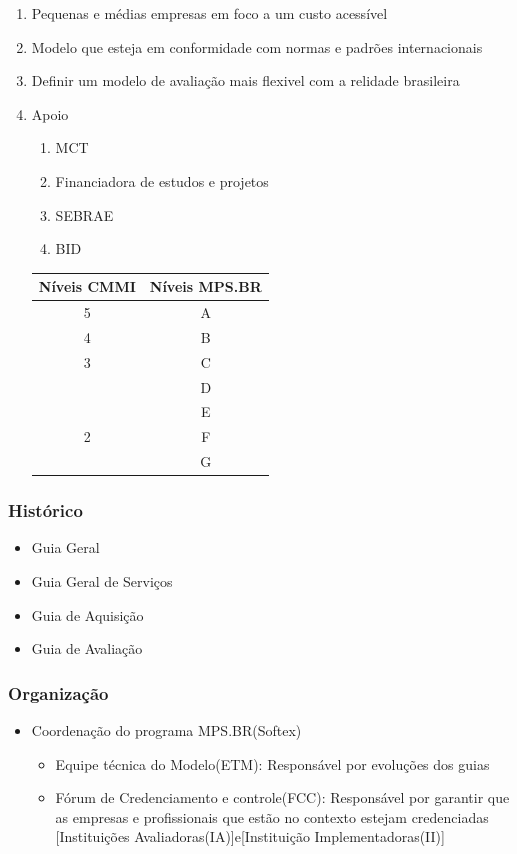 \documentclass{article}
\begin{document}
	\begin{enumerate}		
	
	\item Pequenas e médias empresas em foco a um custo acessível
	\item Modelo que esteja em conformidade com normas e padrões internacionais
	\item Definir um modelo de avaliação mais flexivel com a relidade brasileira
	
	\item Apoio 
		\begin{enumerate}
		\item MCT
		\item Financiadora de estudos e projetos
		\item SEBRAE
		\item BID		
		\end{enumerate}

\begin{center}
	\begin{tabular}{|c|c|}
	\hline 
	Níveis CMMI & Níveis MPS.BR \\
	\hline
	5 &  A\\
	\hline
	4 & B\\
	\hline
	3 & C\\
	& D\\
	& E\\
	\hline
	2 & F\\
	& G	\\
	\hline
	\end{tabular}
\end{center}
		
	\end{enumerate}
			
\subsubsection{Histórico}
	\begin{itemize}
	\item Guia Geral
	\item Guia Geral de Serviços
	\item Guia de Aquisição
	\item Guia de Avaliação
	\end{itemize}		
	

\subsubsection{Organização}
	\begin{itemize}
	\item Coordenação do programa MPS.BR(Softex)
		\begin{itemize}
		\item Equipe técnica do Modelo(ETM): Responsável por evoluções dos guias
		\item Fórum de Credenciamento e controle(FCC): Responsável por garantir que as empresas e profissionais que estão no contexto estejam credenciadas [Instituições Avaliadoras(IA)]e[Instituição Implementadoras(II)]
		
		\end{itemize}			
	\end{itemize}
\end{document}
